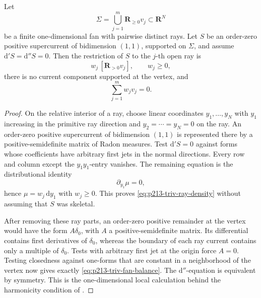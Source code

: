 \begin{lemma}
\label{lem:p213-triv-fan-normal-form}
Let
\[
 \Sigma=\bigcup_{j=1}^m\mathbf R_{\geq0}v_j\subset\mathbf R^N
\]
be a finite one-dimensional fan with pairwise distinct rays.  Let \(S\) be
an order-zero positive supercurrent of bidimension \((1,1)\), supported on
\(\Sigma\), and assume \(\mathrm d'S=\mathrm d''S=0\).  Then the restriction
of \(S\) to the \(j\)-th open ray is
\begin{equation}
              w_j\,[\mathbf R_{>0}v_j],\qquad w_j\geq0,
\label{eq:p213-triv-ray-density}
\end{equation}
there is no current component supported at the vertex, and
\begin{equation}
                         \sum_{j=1}^m w_jv_j=0.
\label{eq:p213-triv-fan-balance}
\end{equation}
\end{lemma}

\begin{proof}
On the relative interior of a ray, choose linear coordinates
\(y_1,\ldots,y_N\) with \(y_1\) increasing in the primitive ray direction
and \(y_2=\cdots=y_N=0\) on the ray.  An order-zero positive supercurrent of
bidimension \((1,1)\) is represented there by a positive-semidefinite
matrix of Radon measures.  Test \(\mathrm d'S=0\) against forms whose
coefficients have arbitrary first jets in the normal directions.  Every
row and column except the \(y_1y_1\)-entry vanishes.  The remaining equation
is the distributional identity
\[
 \partial_{y_1}\mu=0,
\]
hence \(\mu=w_j\,\mathrm dy_1\) with \(w_j\geq0\).  This proves
\eqref{eq:p213-triv-ray-density} without assuming that \(S\) was skeletal.

After removing these ray parts, an order-zero positive remainder at the
vertex would have the form \(A\delta_0\), with \(A\) a positive-semidefinite
matrix.  Its differential contains first derivatives of \(\delta_0\),
whereas the boundary of each ray current contains only a multiple of
\(\delta_0\).  Tests with arbitrary first jet at the origin force \(A=0\).
Testing closedness against one-forms that are constant in a neighborhood
of the vertex now gives exactly
\eqref{eq:p213-triv-fan-balance}.  The \(\mathrm d''\)-equation is equivalent
by symmetry.  This is the one-dimensional local calculation behind the
harmonicity condition of \cite[Theorem~6.6.8 and
Remark~7.7.11]{CLD25}.
\end{proof}

